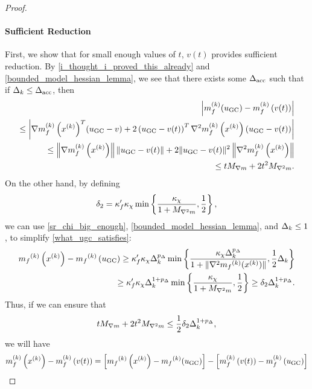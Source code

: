 \begin{proof}
\paragraph*{Sufficient Reduction}
First, we show that for small enough values of $t$, $v(t)$ provides sufficient reduction.
By \cref{i_thought_i_proved_this_already} and \cref{bounded_model_hessian_lemma}, we see that there exists some ${\Delta_{\textrm{acc}}}$ such that if
$\Delta_k \le {\Delta_{\textrm{acc}}}$, then
\begin{align*}
\left|m_f^{(k)}(u_{\textrm{GC}}) - m_f^{(k)}\left(v(t)\right)\right| \\
\le \left|{\nabla m_f^{(k)}\left(x^{(k)}\right)}^T(u_{\textrm{GC}} - v) 
+ 2 \left(u_{\textrm{GC}} - v(t)\right) ^T \nabla^2m_f^{(k)}\left(x^{(k)}\right)\left(u_{\textrm{GC}} - v(t)\right) \right| \\
\le \left\|{\nabla m_f^{(k)}\left(x^{(k)}\right)}\right \|  \left\|u_{\textrm{GC}}- v(t)\right\| + 2  \|u_{\textrm{GC}} - v(t)\|^2 \left\|\nabla^2m_f^{(k)}\left(x^{(k)}\right)\right\| \\
\le t {M_{\nabla m}} + 2t^2{M_{\nabla^2 m}}. 
\end{align*}
On the other hand, by defining
\begin{align}
\delta_2 = \kappa_f' \kappa_{\chi} \min\left\{ \frac{\kappa_{\chi}}{1 + {M_{\nabla^2 m}}}, \frac 1 2 \right\}, \label{define_delta2}
\end{align}
we can use \cref{sr_chi_big_enough}, \cref{bounded_model_hessian_lemma}, and $\Delta_k \le 1$, to simplify \cref{what_ugc_satisfies}:
\begin{align*}
{{m}_f}^{(k)}\left(x^{(k)}\right) - {{m}_f}^{(k)}\left(u_{\textrm{GC}}\right)
\ge \kappa_f' \kappa_{\chi} \Delta_k^{p_{\Delta}} \min\left\{ \frac{\kappa_{\chi} \Delta_k^{p_{\Delta}}}{1+\|\nabla^2 {{m}_f}^{(k)}(x^{(k)})\|}, \frac 1 2 \Delta_k \right\} \\
\ge \kappa_f' \kappa_{\chi} \Delta_k^{1 + p_{\Delta}} \min\left\{ \frac{\kappa_{\chi}}{1 + {M_{\nabla^2 m}}}, \frac 1 2  \right\}
\ge \delta_2 \Delta_k^{1 + p_{\Delta}}.
\end{align*}
Thus, if we can ensure that
\begin{align}
t {M_{\nabla m}} + 2t^2{M_{\nabla^2 m}} \le \frac 1 2 \delta_2 \Delta_k^{1 + p_{\Delta}}, \label{ensure_this}
\end{align}
we will have
\begin{align*}
m_f^{(k)}\left(\xk\right) - m_f^{(k)}\left(v(t)\right) = \left[\mfk\left(\xk\right) - \mfk(u_{\textrm{GC}})\right] - \left[m_f^{(k)}\left(v(t)\right) - m_f^{(k)}\left(u_{\textrm{GC}}\right)\right] \nonumber \\

\end{align*}
\end{proof}
